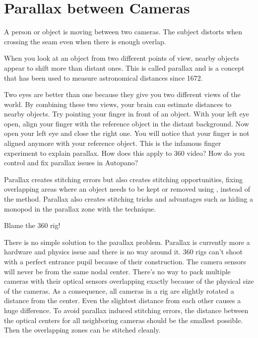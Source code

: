 \chapter{Parallax between Cameras}
\pagecolor{white}
\label{chap:37}
\begin{fullwidth}

\problem

{\large A person or object is moving between two cameras. The subject distorts when crossing the seam even when there is enough overlap. \par}

When you look at an object from two different points of view, nearby objects appear to shift more than distant ones. This is called parallax and is a concept that has been used to measure astronomical distances since 1672.


Two eyes are better than one because they give you two different views of the world. By combining these two views, your brain can estimate distances to nearby objects. Try pointing your finger in front of an object. With your left eye open, align your finger with the reference object in the distant background. Now open your left eye and close the right one. You will notice that your finger is not aligned anymore with your reference object. This is the infamous finger experiment to explain parallax. How does this apply to 360 video? How do you control and fix parallax issues in Autopano?

\solutions

Parallax creates stitching errors but also creates stitching opportunities, fixing overlapping areas where an object needs to be kept or removed using \textbf{}, instead of the \textbf{} method. Parallax also creates stitching tricks and advantages such as hiding a monopod in the parallax zone with the \textbf{} technique.

{\large Blame the 360 rig! \par}

There is no simple solution to the parallax problem. Parallax is currently more a hardware and physics issue and there is no way around it. 360 rigs can't shoot with a perfect entrance pupil because of their construction. The camera sensors will never be from the same nodal center. There’s no way to pack multiple cameras with their optical sensors overlapping exactly because of the physical size of the cameras. As a consequence, all cameras in a rig are slightly rotated a distance from the center. Even the slightest distance from each other causes a huge difference. To avoid parallax induced stitching errors, the distance between the optical centers for all neighboring cameras should be the smallest possible. Then the overlapping zones can be stitched cleanly. 


\end{fullwidth}
